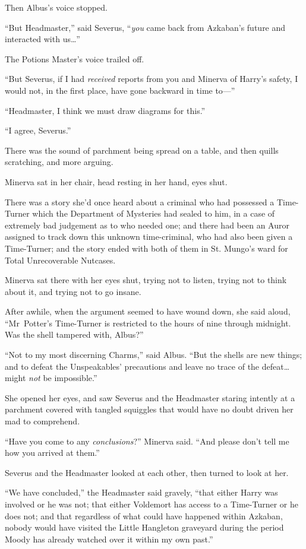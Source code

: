 Then Albus’s voice stopped.

“But Headmaster,” said Severus, “\emph{you} came back from Azkaban’s future and interacted with us…”

The Potions Master’s voice trailed off.

“But Severus, if I had \emph{received} reports from you and Minerva of Harry’s safety, I would not, in the first place, have gone backward in time to—”

“Headmaster, I think we must draw diagrams for this.”

“I agree, Severus.”

There was the sound of parchment being spread on a table, and then quills scratching, and more arguing.

Minerva sat in her chair, head resting in her hand, eyes shut.

There was a story she’d once heard about a criminal who had possessed a Time-Turner which the Department of Mysteries had sealed to him, in a case of extremely bad judgement as to who needed one; and there had been an Auror assigned to track down this unknown time-criminal, who had also been given a Time-Turner; and the story ended with both of them in St. Mungo’s ward for Total Unrecoverable Nutcases.

Minerva sat there with her eyes shut, trying not to listen, trying not to think about it, and trying not to go insane.

After awhile, when the argument seemed to have wound down, she said aloud, “Mr~Potter’s Time-Turner is restricted to the hours of nine \pm through midnight. Was the shell tampered with, Albus?”

“Not to my most discerning Charms,” said Albus. “But the shells are new things; and to defeat the Unspeakables’ precautions and leave no trace of the defeat…might \emph{not} be impossible.”

She opened her eyes, and saw Severus and the Headmaster staring intently at a parchment covered with tangled squiggles that would have no doubt driven her mad to comprehend.

“Have you come to any \emph{conclusions}?” Minerva said. “And please don’t tell me how you arrived at them.”

Severus and the Headmaster looked at each other, then turned to look at her.

“We have concluded,” the Headmaster said gravely, “that either Harry was involved or he was not; that either Voldemort has access to a Time-Turner or he does not; and that regardless of what could have happened within Azkaban, nobody would have visited the Little Hangleton graveyard during the period Moody has already watched over it within my own past.”

